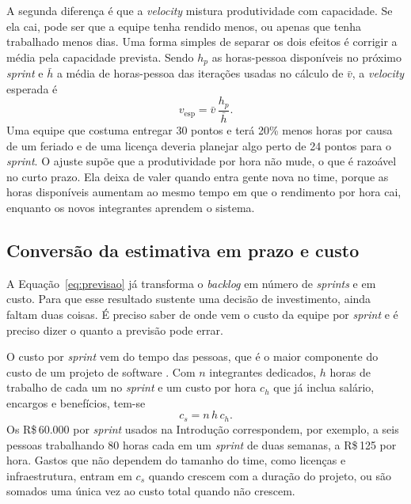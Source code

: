 A segunda diferença é que a \textit{velocity} mistura produtividade com
capacidade. Se ela cai, pode ser que a equipe tenha rendido menos, ou apenas que
tenha trabalhado menos dias. Uma forma simples de separar os dois efeitos é
corrigir a média pela capacidade prevista. Sendo $h_p$ as horas-pessoa
disponíveis no próximo \textit{sprint} e $\bar{h}$ a média de horas-pessoa das
iterações usadas no cálculo de $\bar{v}$, a \textit{velocity} esperada é
%
\begin{equation}
  v_{\text{esp}} = \bar{v}\,\frac{h_p}{\bar{h}} .
  \label{eq:capacidade}
\end{equation}
%
Uma equipe que costuma entregar 30 pontos e terá 20\% menos horas por causa de
um feriado e de uma licença deveria planejar algo perto de 24 pontos para o
\textit{sprint}. O ajuste supõe que a produtividade por hora não mude, o que é
razoável no curto prazo. Ela deixa de valer quando entra gente nova no time, porque as
horas disponíveis aumentam ao mesmo tempo em que o rendimento por hora cai,
enquanto os novos integrantes aprendem o sistema.

\subsection{Conversão da estimativa em prazo e custo}
\label{sub:custo}

A Equação~\ref{eq:previsao} já transforma o \textit{backlog} em número de
\textit{sprints} e em custo. Para que esse resultado sustente uma decisão de
investimento, ainda faltam duas coisas. É preciso saber de onde vem o custo da
equipe por \textit{sprint} e é preciso dizer o quanto a previsão pode errar.

O custo por \textit{sprint} vem do tempo das pessoas, que é o maior componente do
custo de um projeto de software \cite{boehm1981}. Com $n$ integrantes dedicados,
$h$ horas de trabalho de cada um no \textit{sprint} e um custo por hora $c_h$ que
já inclua salário, encargos e benefícios, tem-se
%
\begin{equation}
  c_s = n\,h\,c_h .
  \label{eq:custosprint}
\end{equation}
%
Os R\$\,60.000 por \textit{sprint} usados na Introdução correspondem, por
exemplo, a seis pessoas trabalhando 80 horas cada em um \textit{sprint} de duas
semanas, a R\$\,125 por hora. Gastos que não dependem do tamanho do time, como
licenças e infraestrutura, entram em $c_s$ quando crescem com a duração do
projeto, ou são somados uma única vez ao custo total quando não crescem.

